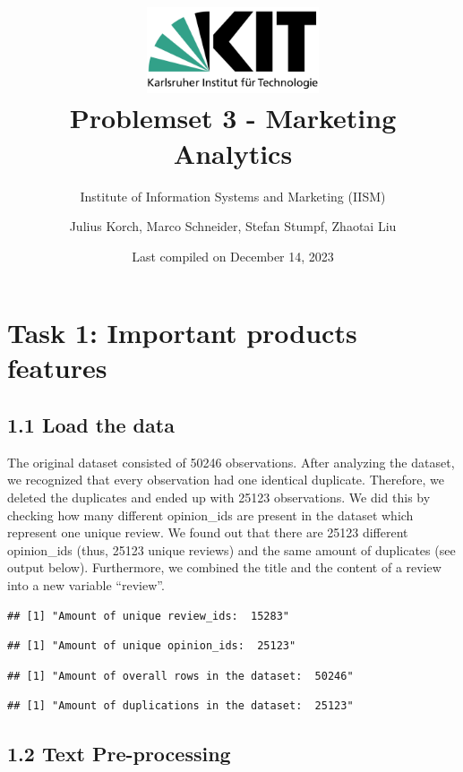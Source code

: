 \documentclass[
]{article}
\title{\includegraphics[width=2in,height=\textheight]{../Images/Logo/Logo_KIT.png}
\vspace{0.2in}\\
Problemset 3 - Marketing Analytics \vspace{0.1in}}
\subtitle{Institute of Information Systems and Marketing (IISM)}
\author{Julius Korch, Marco Schneider, Stefan Stumpf, Zhaotai Liu
\vspace{1in}}
\date{Last compiled on December 14, 2023}
\begin{document}
\maketitle

{
\setcounter{tocdepth}{2}
\tableofcontents
}
\newpage

\hypertarget{task-1-important-products-features}{%
\section{Task 1: Important products
features}\label{task-1-important-products-features}}

\hypertarget{load-the-data}{%
\subsection{1.1 Load the data}\label{load-the-data}}

The original dataset consisted of 50246 observations. After analyzing
the dataset, we recognized that every observation had one identical
duplicate. Therefore, we deleted the duplicates and ended up with 25123
observations. We did this by checking how many different opinion\_ids
are present in the dataset which represent one unique review. We found
out that there are 25123 different opinion\_ids (thus, 25123 unique
reviews) and the same amount of duplicates (see output below).
Furthermore, we combined the title and the content of a review into a
new variable ``review''.

\begin{verbatim}
## [1] "Amount of unique review_ids:  15283"
\end{verbatim}

\begin{verbatim}
## [1] "Amount of unique opinion_ids:  25123"
\end{verbatim}

\begin{verbatim}
## [1] "Amount of overall rows in the dataset:  50246"
\end{verbatim}

\begin{verbatim}
## [1] "Amount of duplications in the dataset:  25123"
\end{verbatim}

\hypertarget{text-pre-processing}{%
\subsection{1.2 Text Pre-processing}\label{text-pre-processing}}
\end{document}
